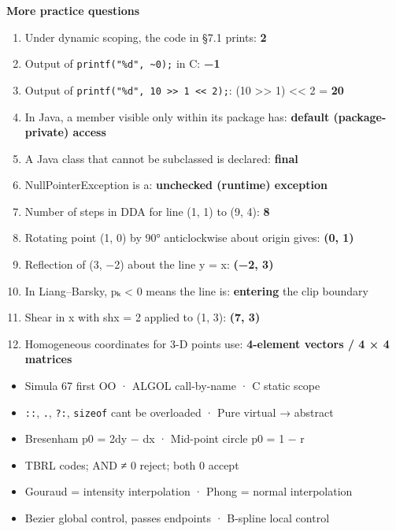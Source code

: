 \textbf{More practice questions}

\begin{enumerate}
\def\labelenumi{\arabic{enumi}.}
\setcounter{enumi}{42}
\tightlist
\item
  Under dynamic scoping, the code in §7.1 prints: \textbf{2}
\item
  Output of \texttt{printf("\%d",\ \textasciitilde{}0);} in C: \textbf{−1}
\item
  Output of \texttt{printf("\%d",\ 10\ \textgreater{}\textgreater{}\ 1\ \textless{}\textless{}\ 2);}: (10 \textgreater\textgreater{} 1) \textless\textless{} 2 = \textbf{20}
\item
  In Java, a member visible only within its package has: \textbf{default (package-private) access}
\item
  A Java class that cannot be subclassed is declared: \textbf{final}
\item
  NullPointerException is a: \textbf{unchecked (runtime) exception}
\item
  Number of steps in DDA for line (1, 1) to (9, 4): \textbf{8}
\item
  Rotating point (1, 0) by 90° anticlockwise about origin gives: \textbf{(0, 1)}
\item
  Reflection of (3, −2) about the line y = x: \textbf{(−2, 3)}
\item
  In Liang--Barsky, pₖ \textless{} 0 means the line is: \textbf{entering} the clip boundary
\item
  Shear in x with shx = 2 applied to (1, 3): \textbf{(7, 3)}
\item
  Homogeneous coordinates for 3-D points use: \textbf{4-element vectors / 4 × 4 matrices}
\end{enumerate}

\begin{revbox}

\begin{itemize}
\tightlist
\item
  Simula 67 first OO · ALGOL call-by-name · C static scope
\item
  \texttt{::}, \texttt{.}, \texttt{?:}, \texttt{sizeof} can\textquotesingle t be overloaded · Pure virtual → abstract
\item
  Bresenham p0 = 2dy − dx · Mid-point circle p0 = 1 − r
\item
  TBRL codes; AND ≠ 0 reject; both 0 accept
\item
  Gouraud = intensity interpolation · Phong = normal interpolation
\item
  Bezier global control, passes endpoints · B-spline local control
\end{itemize}

\end{revbox}
